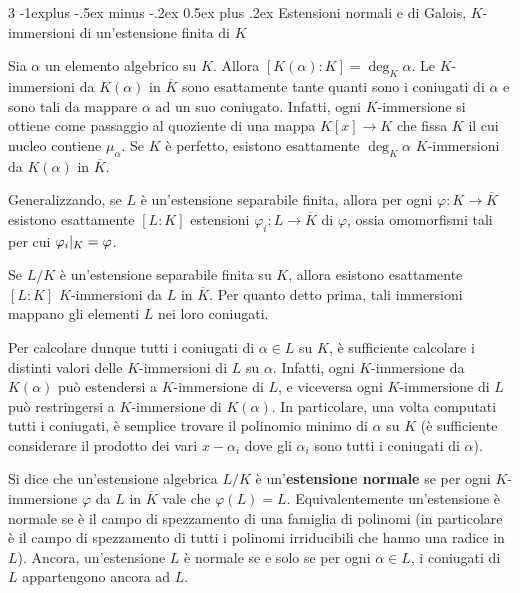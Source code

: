 \documentclass[10pt,landscape]{article}
\makeatletter
\renewcommand{\subsection}{\@startsection{subsection}{2}{0mm}%
	{-1explus -.5ex minus -.2ex}%
	{0.5ex plus .2ex}%
	{\normalfont\normalsize\bfseries}}
\makeatother
\begin{document}
\begin{multicols}{3}
	\subsection{Estensioni normali e di Galois, \texorpdfstring{$K$}{K}-immersioni di un'estensione finita di \texorpdfstring{$K$}{K}}

	Sia $\alpha$ un elemento algebrico su $K$. Allora
	$[K(\alpha) : K] = \deg_K \alpha$. Le
	$K$-immersioni da $K(\alpha)$ in $\overline{K}$
	sono esattamente tante quanti sono i coniugati di
	$\alpha$ e sono tali da mappare $\alpha$ ad un suo coniugato. Infatti,
	ogni $K$-immersione si ottiene come passaggio al quoziente
	di una mappa $K[x] \to K$ che fissa $K$ il cui nucleo contiene
	$\mu_\alpha$. Se $K$ è perfetto, esistono esattamente
	$\deg_K \alpha$ $K$-immersioni da $K(\alpha)$
	in $\overline{K}$. \smallskip

	Generalizzando, se $L$ è un'estensione separabile finita, allora per
	ogni $\varphi : K \to \overline{K}$ esistono
	esattamente $[L : K]$ estensioni $\varphi_i : L \to \overline{K}$ di $\varphi$, ossia omomorfismi
	tali per cui $\varphi_i\arrowvert_{K} = \varphi$. \smallskip

	Se $L / K$ è un'estensione separabile finita su $K$, allora
	esistono esattamente $[L : K]$ $K$-immersioni
	da $L$ in $\overline{K}$. Per quanto detto prima,
	tali immersioni mappano gli elementi $L$ nei
	loro coniugati. \smallskip

	Per calcolare dunque tutti
	i coniugati di $\alpha \in L$ su $K$, è sufficiente
	calcolare i distinti valori delle $K$-immersioni
	di $L$ su $\alpha$. Infatti, ogni $K$-immersione
	da $K(\alpha)$ può estendersi a $K$-immersione di
	$L$, e viceversa ogni $K$-immersione di $L$ può
	restringersi a $K$-immersione di $K(\alpha)$. In
	particolare, una volta computati tutti i coniugati, è semplice trovare il polinomio minimo di $\alpha$
	su $K$ (è sufficiente considerare il prodotto dei vari $x-\alpha_i$ dove gli $\alpha_i$ sono tutti i coniugati di $\alpha$). \smallskip

	Si dice che un'estensione algebrica $L / K$ è un'\textbf{estensione normale}
	se per ogni $K$-immersione $\varphi$ da $L$ in $\overline{K}$
	vale che $\varphi(L) = L$. Equivalentemente
	un'estensione è normale se è il campo di spezzamento
	di una famiglia di polinomi (in particolare è il campo
	di spezzamento di tutti i polinomi irriducibili che
	hanno una radice in $L$). Ancora, un'estensione $L$
	è normale se e solo se per ogni $\alpha \in L$,
	i coniugati di $L$ appartengono ancora ad $L$. \smallskip


\end{multicols}
\end{document}
